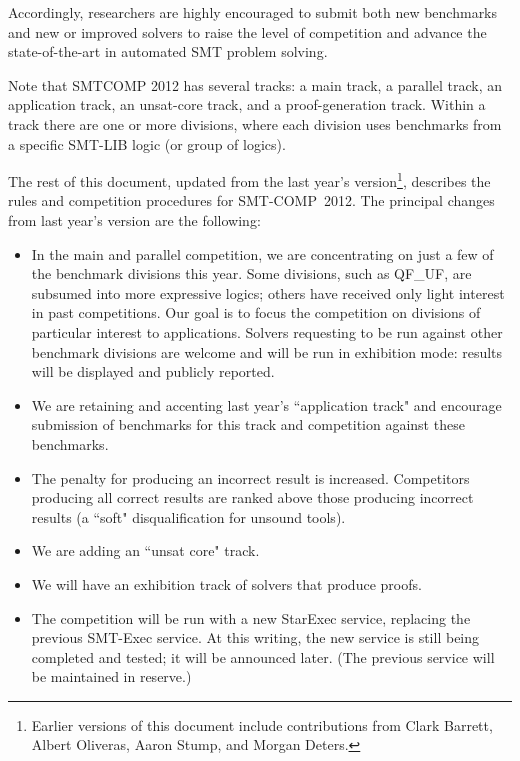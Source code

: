 \documentclass[12pt]{article}
\begin{document}
Accordingly, researchers are highly encouraged to submit both new benchmarks
and new or improved solvers to raise the level of competition and advance
the state-of-the-art in automated SMT problem solving.

Note that SMTCOMP 2012 has several tracks: a main track, a parallel track, an
application track, an unsat-core track, and a proof-generation track.
Within a track there are one or more divisions, where each division
uses benchmarks from a specific SMT-LIB logic (or group of logics).

The rest of this document, updated from the last year's
version\footnote{Earlier versions of this document include contributions from
Clark Barrett, Albert Oliveras, Aaron Stump, and Morgan Deters.},
describes the rules and competition procedures for SMT-COMP~2012.
The principal changes from last year's version are the following:
\begin{itemize}

\item In the main and parallel competition, we are concentrating on just a few of the benchmark divisions this year.
  Some divisions, such as QF\_UF, are subsumed into more expressive
  logics; others have received only light interest in past competitions. Our goal is to
  focus the competition on divisions of particular interest to
  applications. Solvers requesting to be run against other benchmark divisions are
  welcome and will be run in exhibition mode:
  results will be displayed and publicly reported.

\item We are retaining and accenting last year's ``application track" and
  encourage submission of benchmarks for this track and competition against these
  benchmarks.

\item The penalty for producing an incorrect result is increased. Competitors
  producing all correct results are ranked above those producing
  incorrect results (a ``soft" disqualification for unsound tools).

\item We are adding an ``unsat core" track.

\item We will have an exhibition track of solvers that produce proofs.

\item The competition will be run with a new StarExec service, replacing
  the previous SMT-Exec service. At this writing, the new service is
  still being completed and tested; it will be announced later. (The
  previous service will be maintained in reserve.)

\end{itemize}
\end{document}
